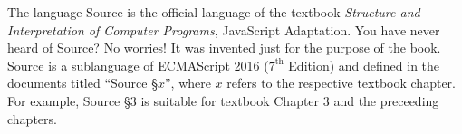 The language Source is the official language of the textbook \emph{Structure and Interpretation
of Computer Programs}, JavaScript Adaptation.
You have never heard of Source? No worries! It was invented
just for the purpose of the book. Source is a sublanguage of 
\href{http://www.ecma-international.org/publications/files/ECMA-ST/Ecma-262.pdf}{
ECMAScript 2016 ($7^{\textrm{th}}$ Edition)} 
and defined in the documents titled ``Source \S $x$'', where $x$ refers to the
respective textbook chapter. For example, Source \S 3 is suitable for textbook Chapter 3
and the preceeding chapters.
